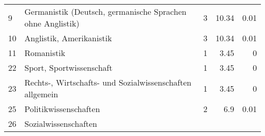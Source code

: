 \begin{longtable}{lXrrr}
     9 &
     \multicolumn{1}{X}{ Germanistik (Deutsch, germanische Sprachen ohne Anglistik)   } &


       \num{3} &
       \num[round-mode=places,round-precision=2]{10.34} &
         \num[round-mode=places,round-precision=2]{0.01} \\

     10 &
     \multicolumn{1}{X}{ Anglistik, Amerikanistik   } &


       \num{3} &
       \num[round-mode=places,round-precision=2]{10.34} &
         \num[round-mode=places,round-precision=2]{0.01} \\

     11 &
     \multicolumn{1}{X}{ Romanistik   } &


       \num{1} &
       \num[round-mode=places,round-precision=2]{3.45} &
         \num[round-mode=places,round-precision=2]{0} \\

     22 &
     \multicolumn{1}{X}{ Sport, Sportwissenschaft   } &


       \num{1} &
       \num[round-mode=places,round-precision=2]{3.45} &
         \num[round-mode=places,round-precision=2]{0} \\

     23 &
     \multicolumn{1}{X}{ Rechts-, Wirtschafts- und Sozialwissenschaften allgemein   } &


       \num{1} &
       \num[round-mode=places,round-precision=2]{3.45} &
         \num[round-mode=places,round-precision=2]{0} \\

     25 &
     \multicolumn{1}{X}{ Politikwissenschaften   } &


       \num{2} &
       \num[round-mode=places,round-precision=2]{6.9} &
         \num[round-mode=places,round-precision=2]{0.01} \\

     26 &
     \multicolumn{1}{X}{ Sozialwissenschaften   } &



\end{longtable}
